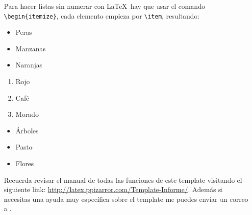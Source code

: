 		Para hacer listas sin numerar con \LaTeX\ hay que usar el comando \texttt{\textbackslash begin\{itemize\}}, cada elemento empieza por \texttt{\textbackslash item}, resultando:
		
		\begin{multicols}{3}
			\begin{itemize}[label={--}]
				\item Peras
				\item Manzanas
				\item Naranjas
			\end{itemize}
			
			\begin{enumerate}[label={*}]
				\item Rojo
				\item Café
				\item Morado
			\end{enumerate}
			
			\begin{itemize}
				\item Árboles
				\item Pasto
				\item Flores
			\end{itemize}
		\end{multicols}
		
		
		Recuerda revisar el manual de todas las funciones de este template visitando el siguiente link: \url{http://latex.ppizarror.com/Template-Informe/}. Además si necesitas una ayuda muy específica sobre el template me puedes enviar un correo a .

